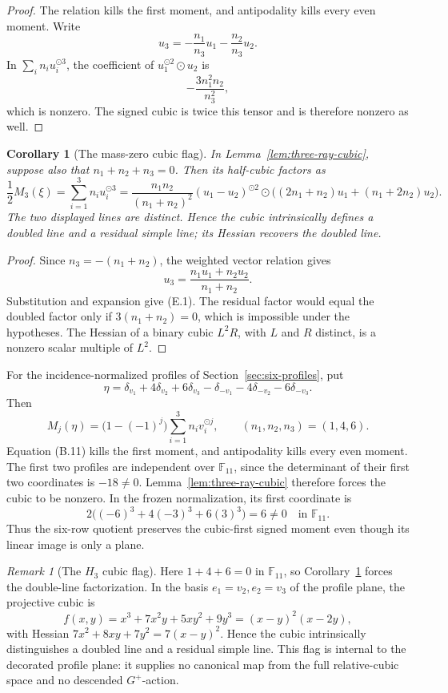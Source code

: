 \documentclass[11pt]{article}
\newtheorem{corollary}[theorem]{Corollary}
\theoremstyle{definition}
\theoremstyle{remark}
\newtheorem{remark}[theorem]{Remark}
\newcommand{\F}{\mathbb{F}}
\begin{document}
\begin{proof}
The relation kills the first moment, and antipodality kills every even
moment.  Write
\[
 u_3=-\frac{n_1}{n_3}u_1-\frac{n_2}{n_3}u_2.
\]
In \(\sum_i n_i u_i^{\odot3}\), the coefficient of
\(u_1^{\odot2}\odot u_2\) is
\[
 -\frac{3n_1^2n_2}{n_3^2},
\]
which is nonzero.  The signed cubic is twice this tensor and is therefore
nonzero as well.
\end{proof}

\begin{corollary}[The mass-zero cubic flag]
\label{cor:mass-zero-cubic}
In Lemma~\ref{lem:three-ray-cubic}, suppose also that
\(n_1+n_2+n_3=0\).  Then its half-cubic factors as
\[
 \frac12M_3(\xi)=\sum_{i=1}^3n_i u_i^{\odot3}
 =\frac{n_1n_2}{(n_1+n_2)^2}
 (u_1-u_2)^{\odot2}\odot
 \bigl((2n_1+n_2)u_1+(n_1+2n_2)u_2\bigr).               \tag{E.1}
\]
The two displayed lines are distinct.  Hence the cubic intrinsically
defines a doubled line and a residual simple line; its Hessian recovers
the doubled line.
\end{corollary}

\begin{proof}
Since \(n_3=-(n_1+n_2)\), the weighted vector relation gives
\[
 u_3=\frac{n_1u_1+n_2u_2}{n_1+n_2}.
\]
Substitution and expansion give (E.1).  The residual factor would equal
the doubled factor only if \(3(n_1+n_2)=0\), which is impossible under
the hypotheses.  The Hessian of a binary cubic \(L^2R\), with \(L\) and
\(R\) distinct, is a nonzero scalar multiple of \(L^2\).
\end{proof}

For the incidence-normalized profiles of Section~\ref{sec:six-profiles},
put
\[
 \eta=\delta_{v_1}+4\delta_{v_2}+6\delta_{v_3}
      -\delta_{-v_1}-4\delta_{-v_2}-6\delta_{-v_3}.
\]
Then
\[
 M_j(\eta)=
 \bigl(1-(-1)^j\bigr)
 \sum_{i=1}^3 n_i v_i^{\odot j},
 \qquad (n_1,n_2,n_3)=(1,4,6).                           \tag{E.2}
\]
Equation (B.11) kills the first moment, and antipodality kills every even
moment.  The first two profiles are independent over \(\F_{11}\), since
the determinant of their first two coordinates is \(-18\ne0\).
Lemma~\ref{lem:three-ray-cubic} therefore forces the cubic to be nonzero.
In the frozen normalization, its first coordinate is
\[
2\bigl((-6)^3+4(-3)^3+6(3)^3\bigr)=6\ne0
\quad\text{in }\F_{11}.                                  \tag{E.3}
\]
Thus the six-row quotient preserves the cubic-first signed moment even
though its linear image is only a plane.

\begin{remark}[The \(H_3\) cubic flag]
\label{rem:cubic-target-flag}
Here \(1+4+6=0\) in \(\F_{11}\), so
Corollary~\ref{cor:mass-zero-cubic} forces the double-line factorization.
In the basis \(e_1=v_2,e_2=v_3\) of the profile plane, the projective
cubic is
\[
 f(x,y)=x^3+7x^2y+5xy^2+9y^3=(x-y)^2(x-2y),
\]
with Hessian \(7x^2+8xy+7y^2=7(x-y)^2\).  Hence the cubic
intrinsically distinguishes a doubled line and a residual simple line.
This flag is internal to the decorated profile plane: it supplies no
canonical map from the full relative-cubic space and no descended
\(G^+\)-action.
\end{remark}
\end{document}
